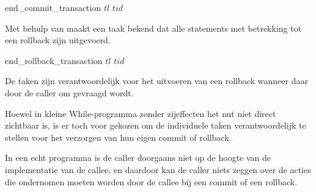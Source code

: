 \begin{functie}{end_commit_transaction $tl$ $tid$}
\end{functie}


Met behulp van  maakt een taak bekend dat alle statements met betrekking tot een rollback
zijn uitgevoerd.

\begin{functie}{end_rollback_transaction $tl$ $tid$}
\end{functie}

De taken zijn verantwoordelijk voor het uitvoeren van een rollback wanneer daar door de caller om gevraagd wordt.

Hoewel in kleine While-programma zonder zijeffecten het nut niet direct zichtbaar is, is er toch voor gekozen om de
individuele taken verantwoordelijk te stellen voor het verzorgen van hun eigen commit of rollback.

In een echt programma is de caller doorgaans niet op de hoogte van de implementatie van de callee, en daardoor kan de
caller niets zeggen over de acties die ondernomen moeten worden door de callee bij een commit of een rollback.
